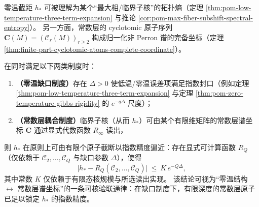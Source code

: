 \begin{remark}\label{rem:pom-zero-temperature-intercept-cyclotomic-truncation}
零温截距 \(h_\ast\) 可被理解为某个“最大相/临界子核”的拓扑熵（定理 \ref{thm:pom-low-temperature-three-term-expansion} 与推论 \ref{cor:pom-max-fiber-subshift-spectral-entropy}）。
另一方面，常数层的 cyclotomic 原子序列 \(\mathbf{C}(M)=(\mathcal{C}_r(M))_{r\ge2}\) 构成归一化非 Perron 谱的完备坐标（定理 \ref{thm:finite-part-cyclotomic-atoms-complete-coordinate}）。
\par
在同时满足以下两类制度时：
\begin{enumerate}
  \item \textbf{（零温缺口制度）}存在 \(\Delta>0\) 使低温/零温误差项满足指数封口（例如定理 \ref{thm:pom-low-temperature-three-term-expansion} 与定理 \ref{thm:pom-zero-temperature-gibbs-rigidity} 的 \(e^{-q\Delta}\) 尺度）；
  \item \textbf{（常数层耦合制度）}临界子核（从而 \(h_\ast\)）可由某个有限维矩阵的常数层谱坐标 \(\mathbf{C}\) 通过显式代数函数 \(R_\infty\) 读出，
\end{enumerate}
则 \(h_\ast\) 在原则上可由有限个原子截断以指数精度逼近：存在显式可计算函数 \(R_Q\)（仅依赖于 \(\mathcal{C}_2,\dots,\mathcal{C}_Q\) 与缺口参数 \(\Delta\)），使得
\[
\bigl|h_\ast-R_Q(\mathcal{C}_2,\dots,\mathcal{C}_Q)\bigr|\ \le\ K\,e^{-Q\Delta},
\]
其中常数 \(K\) 仅依赖于有限态核规模与所选读出实现。
该结论可视为“零温结构 \(\leftrightarrow\) 常数层谱坐标”的一条可核验联通律：在缺口制度下，有限深度的常数层原子已足以锁定 \(h_\ast\) 的指数精度。
\end{remark}
